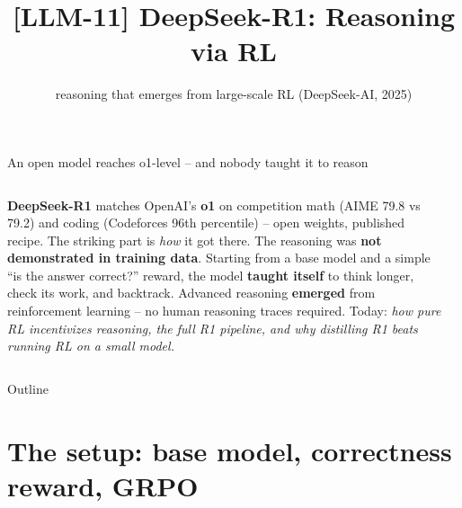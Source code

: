 \documentclass[aspectratio=169]{beamer}
\title{[LLM-11] DeepSeek-R1: Reasoning via RL}
\subtitle{reasoning that emerges from large-scale RL \quad(DeepSeek-AI, 2025)}
\date{}
\begin{document}
\begin{frame}{An open model reaches o1-level -- and nobody taught it to reason}
  \begin{columns}[T]
    \textbf{DeepSeek-R1} matches OpenAI's \textbf{o1} on competition math
    (AIME 79.8 vs 79.2) and coding (Codeforces 96th percentile) -- open weights,
    published recipe.
    \vskip 2pt
    The striking part is \emph{how} it got there. The reasoning was \textbf{not
    demonstrated in training data}. Starting from a base model and a simple
    ``is the answer correct?'' reward, the model \textbf{taught itself} to think
    longer, check its work, and backtrack.
    \vskip 2pt
    Advanced reasoning \textbf{emerged} from reinforcement learning -- no
    human reasoning traces required.
    \vskip 2pt
    Today: \emph{how pure RL incentivizes reasoning, the full R1 pipeline, and
    why distilling R1 beats running RL on a small model.}
    \begin{center}
    \end{center}
  \end{columns}
\end{frame}

\begin{frame}{Outline}
  \tableofcontents
\end{frame}

\section{The setup: base model, correctness reward, GRPO}
\end{document}
